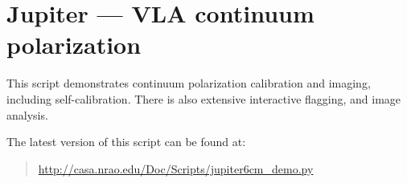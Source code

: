\section{Jupiter --- VLA continuum polarization}
\label{section:scripts.jupiter}

This script demonstrates continuum polarization calibration and
imaging, including self-calibration.  There is also extensive
interactive flagging, and image analysis.

The latest version of this script can be found at:
\begin{quote}
   \url{http://casa.nrao.edu/Doc/Scripts/jupiter6cm_demo.py}
\end{quote}

